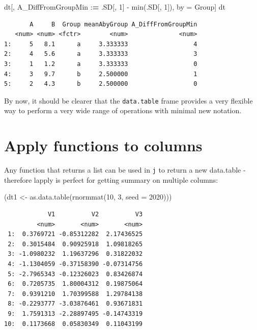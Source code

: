 \documentclass[
]{book}
\newenvironment{Shaded}{\begin{snugshade}}{\end{snugshade}}
\newcommand{\AttributeTok}[1]{\textcolor[rgb]{0.77,0.63,0.00}{#1}}
\newcommand{\DecValTok}[1]{\textcolor[rgb]{0.00,0.00,0.81}{#1}}
\newcommand{\ErrorTok}[1]{\textcolor[rgb]{0.64,0.00,0.00}{\textbf{#1}}}
\newcommand{\FunctionTok}[1]{\textcolor[rgb]{0.00,0.00,0.00}{#1}}
\newcommand{\NormalTok}[1]{#1}
\newcommand{\OtherTok}[1]{\textcolor[rgb]{0.56,0.35,0.01}{#1}}
\newcommand{\SpecialCharTok}[1]{\textcolor[rgb]{0.00,0.00,0.00}{#1}}
\begin{document}
\begin{Shaded}
\begin{Highlighting}[]
\NormalTok{dt[, A\_DiffFromGroupMin }\SpecialCharTok{:}\ErrorTok{=}\NormalTok{ .SD[, }\DecValTok{1}\NormalTok{] }\SpecialCharTok{{-}} \FunctionTok{min}\NormalTok{(.SD[, }\DecValTok{1}\NormalTok{]), by }\OtherTok{=}\NormalTok{ Group]}
\NormalTok{dt}
\end{Highlighting}
\end{Shaded}

\begin{verbatim}
       A     B  Group meanAbyGroup A_DiffFromGroupMin
   <num> <num> <fctr>        <num>              <num>
1:     5   8.1      a     3.333333                  4
2:     4   5.6      a     3.333333                  3
3:     1   1.2      a     3.333333                  0
4:     3   9.7      b     2.500000                  1
5:     2   4.3      b     2.500000                  0
\end{verbatim}

\begin{rmdnote}
By now, it should be clearer that the \texttt{data.table} frame provides
a very flexible way to perform a very wide range of operations with
minimal new notation.
\end{rmdnote}

\hypertarget{apply-functions-to-columns}{%
\section{Apply functions to columns}\label{apply-functions-to-columns}}

Any function that returns a list can be used in \texttt{j} to return a new data.table - therefore lapply is perfect for getting summary on multiple columns:

\begin{Shaded}
\begin{Highlighting}[]
\NormalTok{(dt1 }\OtherTok{\textless{}{-}} \FunctionTok{as.data.table}\NormalTok{(}\FunctionTok{rnormmat}\NormalTok{(}\DecValTok{10}\NormalTok{, }\DecValTok{3}\NormalTok{, }\AttributeTok{seed =} \DecValTok{2020}\NormalTok{)))}
\end{Highlighting}
\end{Shaded}

\begin{verbatim}
            V1          V2          V3
         <num>       <num>       <num>
 1:  0.3769721 -0.85312282  2.17436525
 2:  0.3015484  0.90925918  1.09818265
 3: -1.0980232  1.19637296  0.31822032
 4: -1.1304059 -0.37158390 -0.07314756
 5: -2.7965343 -0.12326023  0.83426874
 6:  0.7205735  1.80004312  0.19875064
 7:  0.9391210  1.70399588  1.29784138
 8: -0.2293777 -3.03876461  0.93671831
 9:  1.7591313 -2.28897495 -0.14743319
10:  0.1173668  0.05830349  0.11043199
\end{verbatim}
\end{document}
